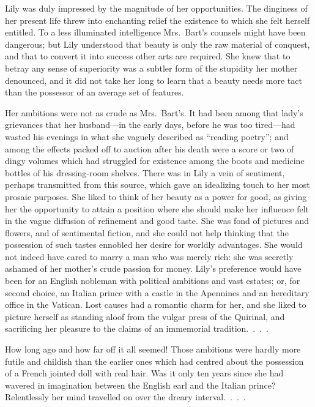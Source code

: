 \documentclass[12pt,a4paper]{book}
\begin{document}
Lily was duly impressed by the magnitude of her opportunities. 
The dinginess of her present life threw into enchanting relief
the existence to which she felt herself entitled. To a less
illuminated intelligence Mrs.\ Bart's counsels might have been
dangerous; but Lily understood that beauty is only the raw
material of conquest, and that to convert it into success other
arts are required. She knew that to betray any sense of
superiority was a subtler form of the stupidity her mother
denounced, and it did not take her long to learn that a beauty
needs more tact than the possessor of an average set of features.





Her ambitions were not as crude as Mrs.\ Bart's. It had been among
that lady's grievances that her husband---in the early days,
before he was too tired---had wasted his evenings in what she
vaguely described as ``reading poetry''; and among the effects
packed off to auction after his death were a score or two of
dingy volumes which had struggled for existence among the boots
and medicine bottles of his dressing-room shelves. There was in
Lily a vein of sentiment, perhaps transmitted from this source,
which gave an idealizing touch to her most prosaic purposes. She
liked to think of her beauty as a power for good, as giving her
the opportunity to attain a position where she should make her
influence felt in the vague diffusion of refinement and good
taste. She was fond of pictures and flowers, and of sentimental
fiction, and she could not help thinking that the possession of
such tastes ennobled her desire for worldly advantages. She would
not indeed have cared to marry a man who was merely rich: she
was secretly ashamed of her mother's crude passion for money. 
Lily's preference would have been for an English nobleman with
political ambitions and vast estates; or, for second
choice, an Italian prince with a castle in the Apennines and an
hereditary office in the Vatican. Lost causes had a romantic
charm for her, and she liked to picture herself as standing aloof
from the vulgar press of the Quirinal, and sacrificing her
pleasure to the claims of an immemorial tradition.\ .\ .\ .





How long ago and how far off it all seemed! Those ambitions were
hardly more futile and childish than the earlier ones which had
centred about the possession of a French jointed doll with real
hair. Was it only ten years since she had wavered in imagination
between the English earl and the Italian prince? Relentlessly her
mind travelled on over the dreary interval.\ .\ .\ .
\end{document}
